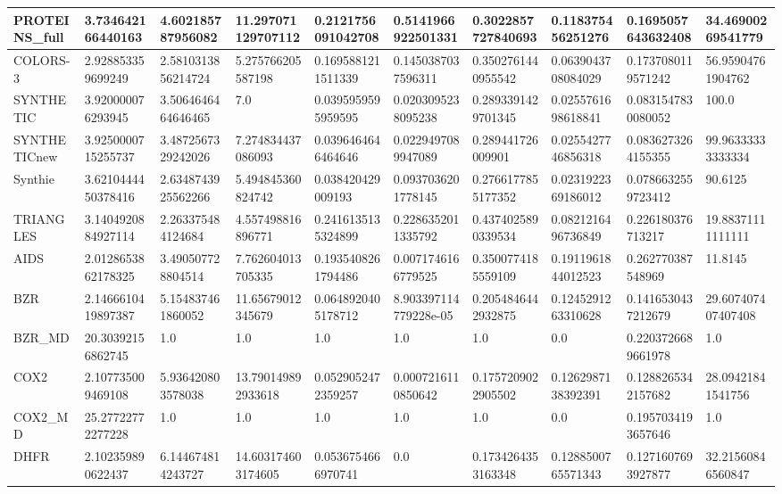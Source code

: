 \documentclass{article}
\begin{document}
\begin{table}[!ht]
\begin{tabular}{|l|l|l|l|l|l|l|l|l|l|}
        PROTEINS\_full & 3.734642166440163 & 4.602185787956082 & 11.297071129707112 & 0.2121756091042708 & 0.5141966922501331 & 0.3022857727840693 & 0.118375456251276 & 0.1695057643632408 & 34.46900269541779 \\ \hline
        COLORS-3 & 2.928853359699249 & 2.5810313856214724 & 5.275766205587198 & 0.1695881211511339 & 0.1450387037596311 & 0.3502761440955542 & 0.0639043708084029 & 0.1737080119571242 & 56.95904761904762 \\ \hline
        SYNTHETIC & 3.920000076293945 & 3.5064646464646465 & 7.0 & 0.0395959595959595 & 0.0203095238095238 & 0.2893391429701345 & 0.0255761698618841 & 0.0831547830080052 & 100.0 \\ \hline
        SYNTHETICnew & 3.9250000715255737 & 3.4872567329242026 & 7.274834437086093 & 0.0396464646464646 & 0.0229497089947089 & 0.289441726009901 & 0.0255427746856318 & 0.0836273264155355 & 99.96333333333334 \\ \hline
        Synthie & 3.6210444450378416 & 2.6348743925562266 & 5.494845360824742 & 0.038420429009193 & 0.0937036201778145 & 0.2766177855177352 & 0.0231922369186012 & 0.0786632559723412 & 90.6125 \\ \hline
        TRIANGLES & 3.1404920884927114 & 2.263375484124684 & 4.557498816896771 & 0.2416135135324899 & 0.2286352011335792 & 0.4374025890339534 & 0.0821216496736849 & 0.226180376713217 & 19.88371111111111 \\ \hline
        AIDS & 2.0128653862178325 & 3.490507728804514 & 7.762604013705335 & 0.1935408261794486 & 0.0071746166779525 & 0.3500774185559109 & 0.1911961844012523 & 0.262770387548969 & 11.8145 \\ \hline
        BZR & 2.1466610419897387 & 5.154837461860052 & 11.65679012345679 & 0.0648920405178712 & 8.903397114779228e-05 & 0.2054846442932875 & 0.1245291263310628 & 0.1416530437212679 & 29.607407407407408 \\ \hline
        BZR\_MD & 20.30392156862745 & 1.0 & 1.0 & 1.0 & 1.0 & 1.0 & 0.0 & 0.2203726689661978 & 1.0 \\ \hline
        COX2 & 2.107735009469108 & 5.936420803578038 & 13.790149892933618 & 0.0529052472359257 & 0.0007216110850642 & 0.1757209022905502 & 0.1262987138392391 & 0.1288265342157682 & 28.09421841541756 \\ \hline
        COX2\_MD & 25.27722772277228 & 1.0 & 1.0 & 1.0 & 1.0 & 1.0 & 0.0 & 0.1957034193657646 & 1.0 \\ \hline
        DHFR & 2.102359890622437 & 6.144674814243727 & 14.603174603174605 & 0.0536754666970741 & 0.0 & 0.1734264353163348 & 0.1288500765571343 & 0.1271607693927877 & 32.21560846560847 \\ \hline

\end{tabular}
\end{table}
\end{document}
